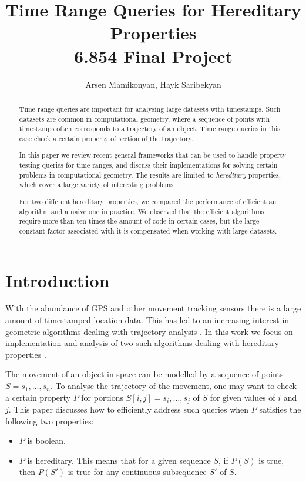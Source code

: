 \documentclass{article}
\begin{document}
\title{Time Range Queries for Hereditary Properties \\ \large 6.854 Final Project}
\author{Arsen Mamikonyan, Hayk Saribekyan}

\maketitle

\begin{abstract}
    Time range queries are important for analysing large datasets
    with timestamps. Such datasets are common in computational
    geometry, where a sequence of points with timestamps often
    corresponds to a trajectory of an object. Time range queries
    in this case check a certain property of section of the trajectory.

    In this paper we review recent general frameworks that can be
    used to handle property testing queries for time ranges, and
    discuss their implementations for solving certain problems in
    computational geometry. The results are limited to \textit{hereditary}
    properties, which cover a large variety of interesting problems.

    For two different hereditary properties, we compared the
    performance of efficient an algorithm and a naive one in practice.
    We observed that the efficient algorithms require more than ten
    times the amount of code in certain cases, but the large constant
    factor associated with it is compensated when working with large
    datasets.
\end{abstract}

\section{Introduction}
\label{sec:intro}

With the abundance of GPS and other movement tracking sensors there
is a large amount of timestamped location data.  This has led to
an increasing interest in geometric algorithms dealing with trajectory
analysis \cite{buchin2011finding, gudmundsson2007efficient,
aronov2016segmentation}.  In this work we focus on implementation
and analysis of two such algorithms dealing with hereditary properties
\cite{bokal2015, chan2016}.

The movement of an object in space can be modelled by a sequence
of points $S = s_1, \dots, s_n$. To analyse the trajectory of the
movement, one may want to check a certain property $P$ for portions
$S[i, j] = s_i, \dots, s_j$ of $S$ for given values of $i$ and $j$.
This paper discusses how to efficiently address such queries when
$P$ satisfies the following two properties:
\begin{itemize}
    \item $P$ is boolean.
    \item $P$ is hereditary. This means that for a given sequence
    $S$, if $P(S)$ is true, then $P(S')$ is true for any continuous
    subsequence $S'$ of $S$.
\end{itemize}
\end{document}

